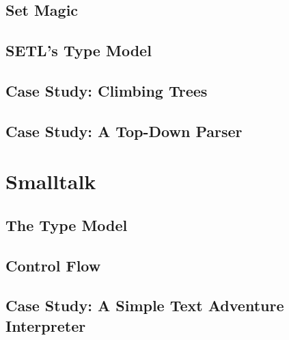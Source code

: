 \documentclass[11pt]{article}
\begin{document}
\subsection{Set Magic}


\subsection{SETL's Type Model}


\subsection{Case Study: Climbing Trees}


\subsection{Case Study: A Top-Down Parser}

\section{Smalltalk}
\subsection{The Type Model}

\subsection{Control Flow}

\subsection{Case Study: A Simple Text Adventure Interpreter}
\end{document}
